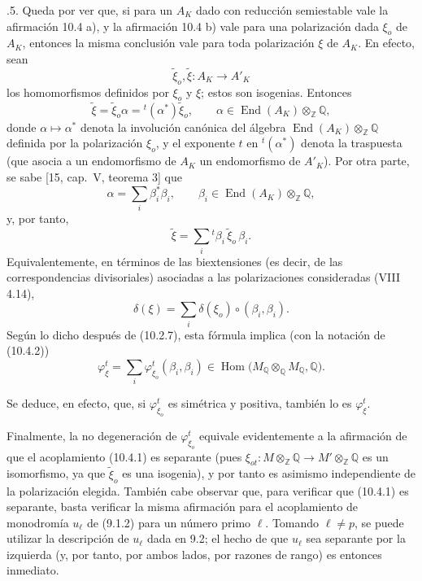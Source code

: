 \smallskip
{}.5. Queda por ver que, si para un $A_K$ dado con reducción
semiestable vale la afirmación 10.4 a), y la afirmación 10.4 b) vale
para una polarización dada $\xi_o$ de $A_K$, entonces la misma
conclusión vale para toda polarización $\xi$ de $A_K$. En efecto, sean
\begin{equation*}
\widetilde\xi_o,\widetilde\xi:A_K\longrightarrow A'_K
\end{equation*}
los homomorfismos definidos por $\xi_o$ y $\xi$; estos son isogenias.
Entonces
\begin{equation*}
\widetilde\xi=\widetilde\xi_o\alpha
 ={}^t(\alpha^*)\widetilde\xi_o,
 \qquad
\alpha\in\operatorname{End}(A_K)\otimes_{\mathbb Z}\mathbb Q,
\end{equation*}
donde $\alpha\longmapsto\alpha^*$ denota la involución canónica del
álgebra $\operatorname{End}(A_K)\otimes_{\mathbb Z}\mathbb Q$
definida por la polarización $\xi_o$, y el exponente $t$ en
${}^t(\alpha^*)$ denota la traspuesta (que asocia a un endomorfismo de
$A_K$ un endomorfismo de $A'_K$). Por otra parte, se sabe [15,
cap.~V, teorema 3] que
\begin{equation*}
\alpha=\sum_i\beta_i^*\beta_i,
 \qquad
\beta_i\in\operatorname{End}(A_K)\otimes_{\mathbb Z}\mathbb Q,
\end{equation*}
y, por tanto,
\begin{equation*}
\widetilde\xi=\sum_i{}^t\beta_i\,\widetilde\xi_o\,\beta_i.
\end{equation*}
Equivalentemente, en términos de las biextensiones (es decir, de las
correspondencias divisoriales) asociadas a las polarizaciones
consideradas (VIII 4.14),
\begin{equation}\tag{10.5.5.1}
\delta(\xi)=\sum_i\delta(\xi_o)\circ(\beta_i,\beta_i).
\end{equation}
Según lo dicho después de (10.2.7), esta fórmula implica (con la
notación de (10.4.2))
\begin{equation}\tag{10.5.5.2}
\varphi^t_\xi
 =\sum_i\varphi^t_{\xi_o}(\beta_i,\beta_i)
 \in\operatorname{Hom}
 \bigl(M_{\mathbb Q}\otimes_{\mathbb Q}M_{\mathbb Q},\mathbb Q\bigr).
\end{equation}


Se deduce, en efecto, que, si $\varphi^t_{\xi_o}$ es simétrica y
positiva, también lo es $\varphi^t_\xi$.

Finalmente, la no degeneración de $\varphi^t_{\xi_o}$ equivale
evidentemente a la afirmación de que el acoplamiento (10.4.1) es
separante (pues
$\xi_{ot}:M\otimes_{\mathbb Z}\mathbb Q
\longrightarrow M'\otimes_{\mathbb Z}\mathbb Q$ es un isomorfismo, ya
que $\widetilde\xi_o$ es una isogenia), y por tanto es asimismo
independiente de la polarización elegida. También cabe observar que,
para verificar que (10.4.1) es separante, basta verificar la misma
afirmación para el acoplamiento de monodromía $u_\ell$ de (9.1.2) para
un número primo $\ell$. Tomando $\ell\ne p$, se puede utilizar la
descripción de $u_\ell$ dada en 9.2; el hecho de que $u_\ell$ sea
separante por la izquierda (y, por tanto, por ambos lados, por razones
de rango) es entonces inmediato.
